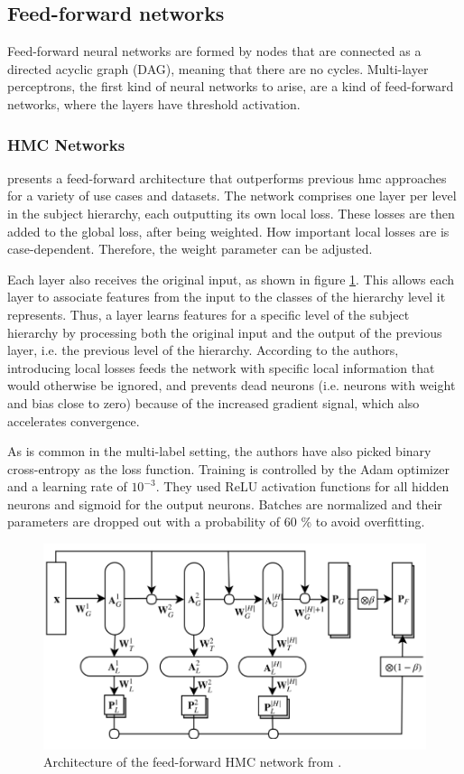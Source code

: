 \subsection{Feed-forward networks}  \label{hmc_forward}

Feed-forward neural networks are formed by nodes that are connected as a directed acyclic graph (DAG), meaning that there are no cycles. Multi-layer perceptrons, the first kind of neural networks to arise, are a kind of feed-forward networks, where the layers have threshold activation.

\subsubsection{HMC Networks}

\cite{wehrmann2018hierarchical} presents a feed-forward architecture that outperforms previous \acrshort{hmc} approaches for a variety of use cases and datasets. The network comprises one layer per level in the subject hierarchy, each outputting its own local loss. These losses are then added to the global loss, after being weighted. How important local losses are is case-dependent. Therefore, the weight parameter can be adjusted.

Each layer also receives the original input, as shown in figure \ref{fig:hmcn-f}. This allows each layer to associate features from the input to the classes of the hierarchy level it represents. Thus, a layer learns features for a specific level of the subject hierarchy by processing both the original input and the output of the previous layer, i.e. the previous level of the hierarchy. According to the authors, introducing local losses feeds the network with specific local information that would otherwise be ignored, and prevents dead neurons (i.e. neurons with weight and bias close to zero) because of the increased gradient signal, which also accelerates convergence.

As is common in the multi-label setting, the authors have also picked binary cross-entropy as the loss function. Training is controlled by the Adam optimizer and a learning rate of $10^{-3}$. They used ReLU activation functions for all hidden neurons and sigmoid for the output neurons. Batches are normalized and their parameters are dropped out with a probability of 60 \% to avoid overfitting.

\begin{figure}
    \centering
    \includegraphics[width=.8\textwidth]{figures/hmc/hmcn-f.png}
    \caption{Architecture of the feed-forward HMC network from \cite{wehrmann2018hierarchical}.}
    \label{fig:hmcn-f}
\end{figure}

